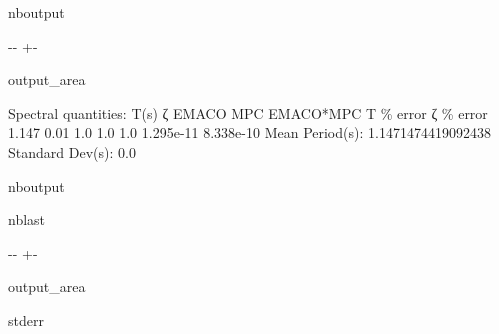 \documentclass[letterpaper,10pt,english]{sphinxmanual}
\begin{document}
\begin{sphinxuseclass}{nboutput}
{

\kern-\sphinxverbatimsmallskipamount\kern-\baselineskip
\kern+\FrameHeightAdjust\kern-\fboxrule
\vspace{\nbsphinxcodecellspacing}

\begin{sphinxuseclass}{output_area}
\begin{sphinxuseclass}{}


\begin{sphinxVerbatim}[commandchars=\\\{\}]
Spectral quantities:
       T(s)        ζ        EMACO      MPC       EMACO*MPC     T \% error    ζ \% error
      1.147      0.01       1.0        1.0        1.0          1.295e-11    8.338e-10
Mean Period(s): 1.1471474419092438
Standard Dev(s): 0.0
\end{sphinxVerbatim}



\end{sphinxuseclass}
\end{sphinxuseclass}
}

\end{sphinxuseclass}
\begin{sphinxuseclass}{nboutput}
\begin{sphinxuseclass}{nblast}
{

\kern-\sphinxverbatimsmallskipamount\kern-\baselineskip
\kern+\FrameHeightAdjust\kern-\fboxrule
\vspace{\nbsphinxcodecellspacing}

\begin{sphinxuseclass}{output_area}
\begin{sphinxuseclass}{stderr}


\begin{sphinxVerbatim}[commandchars=\\\{\}]

\end{sphinxVerbatim}

\end{sphinxuseclass}
\end{sphinxuseclass}
}

\end{sphinxuseclass}
\end{sphinxuseclass}
\end{document}
